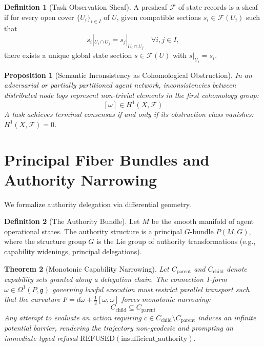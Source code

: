 \documentclass[11pt,twoside,openright]{report}
\theoremstyle{definition}
\newtheorem{definition}{Definition}[chapter]
\theoremstyle{plain}
\newtheorem{theorem}{Theorem}[chapter]
\newtheorem{proposition}[theorem]{Proposition}
\theoremstyle{remark}
\begin{document}
\begin{definition}[Task Observation Sheaf]
A presheaf $\mathcal{F}$ of state records is a sheaf if for every open cover $\{U_i\}_{i \in I}$ of $U$, given compatible sections $s_i \in \mathcal{F}(U_i)$ such that
\[
s_i|_{U_i \cap U_j} = s_j|_{U_i \cap U_j} \quad \forall i, j \in I,
\]
there exists a unique global state section $s \in \mathcal{F}(U)$ with $s|_{U_i} = s_i$.
\end{definition}

\begin{proposition}[Semantic Inconsistency as Cohomological Obstruction]
In an adversarial or partially partitioned agent network, inconsistencies between distributed node logs represent non-trivial elements in the first cohomology group:
\[
[\omega] \in H^1(X, \mathcal{F})
\]
A task achieves terminal consensus if and only if its obstruction class vanishes: $H^1(X, \mathcal{F}) = 0$.
\end{proposition}

\section{Principal Fiber Bundles and Authority Narrowing}
We formalize authority delegation via differential geometry.

\begin{definition}[The Authority Bundle]
Let $M$ be the smooth manifold of agent operational states. The authority structure is a principal $G$-bundle $P(M, G)$, where the structure group $G$ is the Lie group of authority transformations (e.g., capability widenings, principal delegations).
\end{definition}

\begin{theorem}[Monotonic Capability Narrowing]
Let $C_{\mathrm{parent}}$ and $C_{\mathrm{child}}$ denote capability sets granted along a delegation chain. The connection 1-form $\omega \in \Omega^1(P, \mathfrak{g})$ governing lawful execution must restrict parallel transport such that the curvature $F = d\omega + \frac{1}{2}[\omega, \omega]$ forces monotonic narrowing:
\begin{equation}
C_{\mathrm{child}} \subseteq C_{\mathrm{parent}}
\end{equation}
Any attempt to evaluate an action requiring $c \in C_{\mathrm{child}} \setminus C_{\mathrm{parent}}$ induces an infinite potential barrier, rendering the trajectory non-geodesic and prompting an immediate typed refusal $\mathrm{REFUSED}(\mathrm{insufficient\_authority})$.
\end{theorem}
\end{document}
